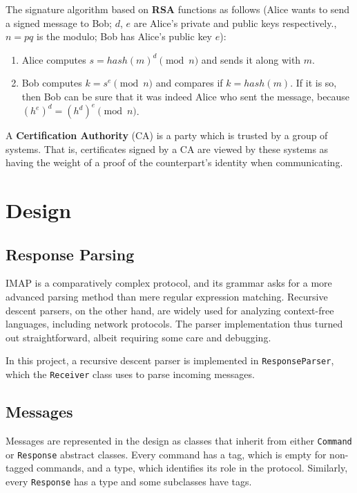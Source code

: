 \documentclass[a4]{report}
\begin{document}
The signature algorithm based on \textbf{RSA} functions as follows (Alice wants to send a signed message to Bob; $d$, $e$ are Alice's private and public keys respectively., $n=pq$ is the modulo; Bob has Alice's public key $e$):

\begin{enumerate}
  \item Alice computes $s=hash(m)^{d}\pmod{n}$ and sends it along with $m$.
  \item Bob computes $k=s^{e} \pmod{n}$ and compares if $k = hash(m)$. If it is so, then Bob can be sure that it was indeed Alice who sent the message, because $(h^{e})^{d}=(h^{d})^{e} \pmod{n}$.
\end{enumerate}

A \textbf{Certification Authority} (CA) is a party which is trusted by a group of systems. That is, certificates signed by a CA are viewed by these systems as having the weight of a proof of the counterpart's identity when communicating.

\chapter{Design}


\section{Response Parsing}

IMAP is a comparatively complex protocol, and its grammar asks for a more advanced parsing method than mere regular expression matching. Recursive descent parsers, on the other hand, are widely used for analyzing context-free languages, including network protocols. The parser implementation thus turned out straightforward, albeit requiring some care and debugging.

In this project, a recursive descent parser is implemented in \texttt{ResponseParser}, which the \texttt{Receiver} class uses to parse incoming messages.

\section{Messages}

Messages are represented in the design as classes that inherit from either \texttt{Command} or \texttt{Response} abstract classes. Every command has a tag, which is empty for non-tagged commands, and a type, which identifies its role in the protocol. Similarly, every \texttt{Response} has a type and some subclasses have tags.
\end{document}
